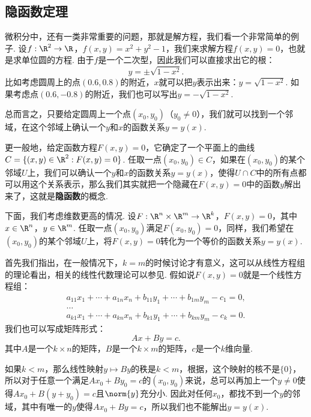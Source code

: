 \subsection{隐函数定理}

微积分中，还有一类非常重要的问题，那就是解方程，我们看一个非常简单的例子. 设$f:\R^2\to\R$，$f(x,y)=x^2+y^2-1$，我们来求解方程$f(x,y)=0$，也就是求单位圆的方程. 由于$f$是一个二次型，因此我们可以直接求出它的根：
    \[y=\pm\sqrt{1-x^2}.\]
比如考虑圆周上的点$(0.6,0.8)$的附近，$x$就可以把$y$表示出来：$y=\sqrt{1-x^2}$. 如果考虑点$(0.6,-0.8)$的附近，我们也可以写出$y=-\sqrt{1-x^2}$. 
    
总而言之，只要给定圆周上一个点$(x_0,y_0)$（$y_0\neq 0$），我们就可以找到一个邻域，在这个邻域上确认一个$y$和$x$的函数关系$y=y(x)$.

更一般地，给定函数方程$F(x,y)=0$，它确定了一个平面上的曲线$C=\{(x,y)\in\R^2:F(x,y)=0\}$. 任取一点$(x_0,y_0)\in C$，如果在$(x_0,y_0)$的某个邻域$U$上，我们可以确认一个$y$和$x$的函数关系$y=y(x)$，使得$U\cap C$中的所有点都可以用这个关系表示，那么我们其实就把一个隐藏在$F(x,y)=0$中的函数$y$解出来了，这就是\textbf{隐函数}的概念.

下面，我们考虑维数更高的情况. 设$F:\R^n\times\R^m\to\R^k$，$F(x,y)=0$，其中$x\in\R^n$，$y\in\R^m$. 任取一点$(x_0,y_0)$满足$F(x_0,y_0)=0$，同样，我们希望在$(x_0,y_0)$的某个邻域$U$上，将$F(x,y)=0$转化为一个等价的函数关系$y=y(x)$. 

首先我们指出，在一般情况下，$k=m$的时候讨论才有意义，这可以从线性方程组的理论看出，相关的线性代数理论可以参见. 假如说$F(x,y)=0$就是一个线性方程组：
\begin{equation}
    \begin{gathered}
        a_{11}x_1+\cdots+a_{1n}x_n+b_{11}y_1+\cdots+b_{1m}y_m-c_1=0, \\
        \dots \\
        a_{k1}x_1+\cdots+a_{kn}x_n+b_{k1}y_1+\cdots+b_{km}y_m-c_k=0.
    \end{gathered}
    \label{eq:linear-equation}
\end{equation}
我们也可以写成矩阵形式：
\[Ax+By=c.\]
其中$A$是一个$k\times n$的矩阵，$B$是一个$k\times m$的矩阵，$c$是一个$k$维向量.

如果$k<m$，那么线性映射$y\mapsto By$的秩是$k<m$，根据，这个映射的核不是$\{0\}$，所以对于任意一个满足$Ax_0+By_0=c$的$(x_0,y_0)$来说，总可以再加上一个$y\neq 0$使得$Ax_0+B(y+y_0)=c$且$\norm{y}$充分小. 因此对任何$x_0$，都找不到一个$y$的邻域，其中有唯一的$y$使得$Ax_0+By=c$，所以我们也不能解出$y=y(x)$.

